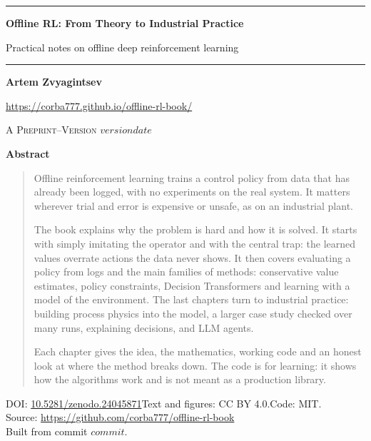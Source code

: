 \begin{titlepage}
\thispagestyle{empty}
\vspace*{3.5cm}
\noindent\rule{\textwidth}{2pt}
\begin{center}
  {\LARGE\bfseries Offline RL: From Theory to Industrial Practice\par}
  \vspace{0.6em}
  {\large Practical notes on offline deep reinforcement learning\par}
\end{center}
\noindent\rule{\textwidth}{0.6pt}

\vspace{1.6cm}
\begin{center}
  {\large\bfseries Artem Zvyagintsev\par}
  \vspace{0.3em}
  {\normalsize\url{https://corba777.github.io/offline-rl-book/}\par}
  \vspace{1.2em}
  {\normalsize\scshape A Preprint\quad--\quad Version $version$\quad\textperiodcentered\quad $date$\par}
\end{center}

\vspace{1.6cm}
\begin{center}\textbf{Abstract}\end{center}
\begin{quote}
Offline reinforcement learning trains a control policy from data that has
already been logged, with no experiments on the real system. It matters wherever
trial and error is expensive or unsafe, as on an industrial plant.

The book explains why the problem is hard and how it is solved. It starts with
simply imitating the operator and with the central trap: the learned values
overrate actions the data never shows. It then covers evaluating a policy from
logs and the main families of methods: conservative value estimates, policy
constraints, Decision Transformers and learning with a model of the
environment. The last chapters turn to industrial practice: building process
physics into the model, a larger case study checked over many runs, explaining
decisions, and LLM agents.

Each chapter gives the idea, the mathematics, working code and an honest look
at where the method breaks down. The code is for learning: it shows how the
algorithms work and is not meant as a production library.
\end{quote}

\vfill
\begin{center}\footnotesize
DOI: \href{https://doi.org/10.5281/zenodo.24045871}{10.5281/zenodo.24045871}\quad Text and figures: CC BY 4.0.\quad Code: MIT.\\
Source: \url{https://github.com/corba777/offline-rl-book}\\
Built from commit $commit$.
\end{center}
\end{titlepage}
\setcounter{page}{2}   %
